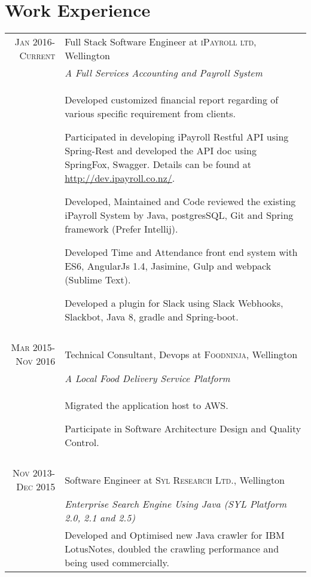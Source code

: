 \documentclass[a4paper,10pt]{article} %
\begin{document}
\section{Work Experience}


\begin{tabular}{r|p{11cm}}
\textsc{Jan 2016-Current} & Full Stack Software Engineer at \textsc{iPayroll ltd}, Wellington \\
& \emph{A Full Services Accounting and Payroll System}\\ 
& \footnotesize{
Developed customized financial report regarding of various specific requirement from clients.

Participated in developing iPayroll Restful API using Spring-Rest and developed the API doc using SpringFox, Swagger. Details can be found at \href{http://dev.ipayroll.co.nz/}{http://dev.ipayroll.co.nz/}.

Developed, Maintained and Code reviewed the existing iPayroll System by Java, postgresSQL, Git and Spring framework (Prefer Intellij). 

Developed Time and Attendance front end system with ES6, AngularJs 1.4, Jasimine, Gulp and webpack (Sublime Text).

Developed a plugin for Slack using Slack Webhooks, Slackbot, Java 8, gradle and Spring-boot.
}\\
\multicolumn{2}{c}{} \\


\textsc{Mar 2015-Nov 2016} & Technical Consultant, Devops at \textsc{Foodninja}, Wellington \\
& \emph{A Local Food Delivery Service Platform}\\ 
& \footnotesize{
Migrated the application host to AWS.

Participate in Software Architecture Design and Quality Control.
}\\
\multicolumn{2}{c}{} \\


\textsc{Nov 2013-Dec 2015} & Software Engineer at \textsc{Syl Research Ltd.}, Wellington \\
& \emph{Enterprise Search Engine Using Java (SYL Platform 2.0, 2.1 and 2.5)}\\ 
& \footnotesize{
Developed and Optimised new Java crawler for IBM LotusNotes, doubled the crawling performance and being used commercially.

}
\end{tabular}
\end{document}
